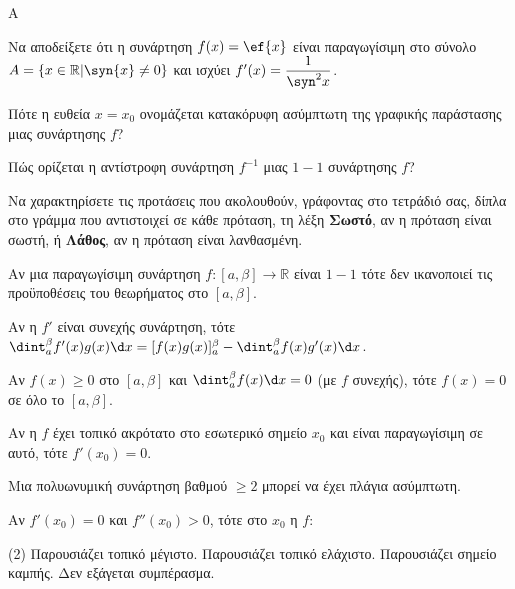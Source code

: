 \begin{thema}{A}
\begin{erwthma}
    \item Να αποδείξετε ότι η συνάρτηση $ f(x)=\ef{x} $ είναι παραγωγίσιμη στο σύνολο $ A=\{x\in\mathbb{R}|\syn{x}\neq 0\} $ και ισχύει $ f'(x)=\dfrac{1}{\syn^2{x}} $.
    \item Πότε η ευθεία $x=x_0$ ονομάζεται κατακόρυφη ασύμπτωτη της γραφικής παράστασης μιας συνάρτησης $f$?
    \item Πώς ορίζεται η αντίστροφη συνάρτηση $f^{-1}$ μιας $1-1$ συνάρτησης $f$?
    \item Να χαρακτηρίσετε τις προτάσεις που ακολουθούν, γράφοντας στο τετράδιό σας, δίπλα στο γράμμα που αντιστοιχεί σε κάθε πρόταση, τη λέξη \textbf{Σωστό}, αν η πρόταση είναι σωστή, ή \textbf{Λάθος}, αν η πρόταση είναι λανθασμένη.
    \begin{alist}
        \item Αν μια παραγωγίσιμη συνάρτηση $f:[a,\beta]\to\mathbb{R}$ είναι $1-1$ τότε δεν ικανοποιεί τις προϋποθέσεις του θεωρήματος  στο $[a,\beta]$.
        \item Αν η $f'$ είναι συνεχής συνάρτηση, τότε $\dint_{a}^{\beta} f'(x)g(x)\d x = [f(x)g(x)]_{a}^{\beta} - \dint_{a}^{\beta} f(x)g'(x)\d x$.
        \item Αν $f(x) \ge 0$ στο $[a, \beta]$ και $\dint_a^\beta f(x)\d x = 0$ (με $f$ συνεχής), τότε $f(x) = 0$ σε όλο το $[a, \beta]$.
        \item Αν η $f$ έχει τοπικό ακρότατο στο εσωτερικό σημείο $x_0$ και είναι παραγωγίσιμη σε αυτό, τότε $f'(x_0) = 0$.
        \item Μια πολυωνυμική συνάρτηση βαθμού $\ge 2$ μπορεί να έχει πλάγια ασύμπτωτη.
    \end{alist}
    \item Αν $f'(x_0) = 0$ και $f''(x_0) > 0$, τότε στο $x_0$ η $f$:
    \begin{tasks}[label=\let\textdexiakeraia\relax\alph*.](2)
        \task Παρουσιάζει τοπικό μέγιστο.
        \task Παρουσιάζει τοπικό ελάχιστο.
        \task Παρουσιάζει σημείο καμπής.
        \task Δεν εξάγεται συμπέρασμα.
    \end{tasks}
\end{erwthma}
\end{thema}
